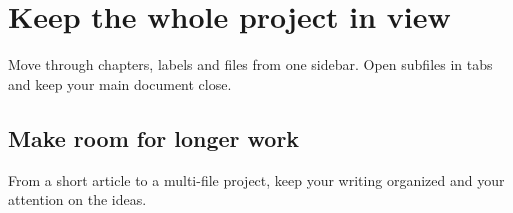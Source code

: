 \section{Keep the whole project in view}
\label{sec:projects}
Move through chapters, labels and files
from one sidebar. Open subfiles in tabs
and keep your main document close.

\subsection{Make room for longer work}
From a short article to a multi-file
project, keep your writing organized
and your attention on the ideas.
